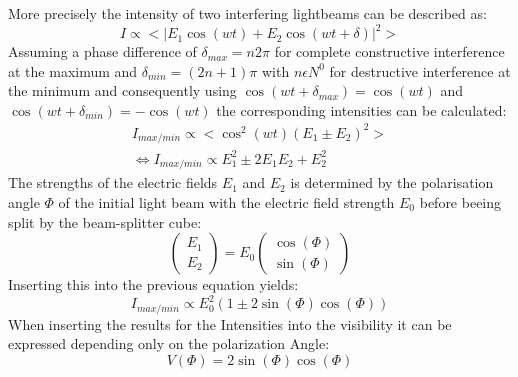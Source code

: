 More precisely the intensity of two interfering lightbeams can be described as:
\begin{equation*}
I \propto \bigl<|E_1\cos(wt)+E_2\cos(wt+\delta)|^2\bigr>
\end{equation*}
Assuming a phase difference of $\delta_{max}=n2\pi$ for complete constructive interference at the maximum and $\delta_{min}=(2n+1)\pi$ with $n\epsilon N^0$ for destructive interference at the minimum and consequently using $\cos(wt+\delta_{max})=\cos(wt)$ and $\cos(wt+\delta_{min})=-\cos(wt)$ the corresponding intensities can be calculated:
\begin{gather*}
I_{max/min}\propto \bigl<\cos^2(wt)(E_1\pm E_2)^2\bigr> \\
\iff I_{max/min}\propto E_1^2\pm 2E_1E_2 + E_2^2 
\end{gather*}
The strengths of the electric fields $E_1$ and $E_2$ is determined by the polarisation angle $\Phi$ of the initial light beam with the electric field strength $E_0$ before beeing split by the beam-splitter cube:
\begin{equation*}
\begin{pmatrix} E_1 \\ E_2\end{pmatrix}=E_0\begin{pmatrix}\cos(\Phi) \\ \sin(\Phi)\end{pmatrix}
\end{equation*}
Inserting this into the previous equation yields:
\begin{equation}
I_{max/min} \propto E_0^2(1\pm 2\sin(\Phi)\cos(\Phi))
\end{equation}
When inserting the results for the Intensities into the visibility it can be expressed depending only on the polarization Angle:
\begin{equation}
V (\Phi)=2\sin(\Phi)\cos(\Phi)
\end{equation}
